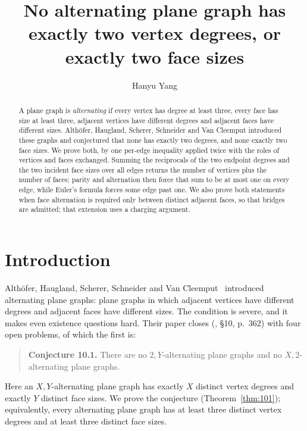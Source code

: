 \documentclass{baustms}
\theoremstyle{cupthm}
\theoremstyle{cupdefn}
\theoremstyle{cuprem}
\begin{document}
\title{No alternating plane graph has exactly two vertex degrees,
       or exactly two face sizes}
\author[1]{Hanyu Yang}
\address[1]{Independent researcher, California, USA}

\begin{abstract}
A plane graph is \emph{alternating} if every vertex has degree at least three,
every face has size at least three, adjacent vertices have different degrees and
adjacent faces have different sizes. Alth\"ofer, Haugland, Scherer, Schneider and
Van Cleemput introduced these graphs and conjectured that none has exactly two
degrees, and none exactly two face sizes. We prove both, by one per-edge
inequality applied twice with the roles of vertices and faces exchanged. Summing the reciprocals of the two endpoint degrees and the two
incident face sizes over all edges returns the number of vertices plus the number
of faces; parity and alternation then force that sum to be at most one on every
edge, while Euler's formula forces some edge past one. We also prove both
statements when face alternation is required only between distinct adjacent
faces, so that bridges are admitted; that extension uses a charging argument.
\end{abstract}

\section{Introduction}

Alth\"ofer, Haugland, Scherer, Schneider and Van Cleemput~\cite{AHSSV2015}
introduced alternating plane graphs: plane graphs in which adjacent vertices
have different degrees and adjacent faces have different sizes. The condition is
severe, and it makes even existence questions hard. Their paper closes
(\cite{AHSSV2015}, \S10, p.~362) with four open problems, of which the first is:

\begin{quote}
\textbf{Conjecture 10.1.} There are no $2,Y$-alternating plane graphs and no
$X,2$-alternating plane graphs.
\end{quote}

Here an $X,Y$-alternating plane graph has exactly $X$ distinct vertex degrees
and exactly $Y$ distinct face sizes. We prove the conjecture
(Theorem~\ref{thm:101}); equivalently, every alternating plane graph has at least
three distinct vertex degrees and at least three distinct face sizes.
\end{document}
